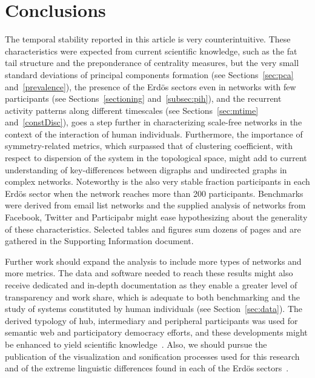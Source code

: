 \documentclass[%
	aip,
	jmp,%
	amsmath,amssymb,
	reprint,%
]{revtex4-1}
\begin{document}
\section{Conclusions}\label{sec:conc}
The temporal stability reported in this article is very counterintuitive.
These characteristics were expected from current scientific knowledge,
such as the fat tail structure and the preponderance of centrality measures,
but the very small standard deviations of principal components formation
(see Sections~\ref{sec:pca} and~\ref{prevalence}),
the presence of the Erd\"os sectors even in networks with
few participants (see Sections~\ref{sectioning} and~\ref{subsec:pih}),
and the recurrent activity patterns along different timescales (see Sections~\ref{sec:mtime} and~\ref{constDisc}),
goes a step further in characterizing scale-free networks in the context
of the interaction of human individuals.
Furthermore, the importance of symmetry-related metrics,
which surpassed that of clustering coefficient,
with respect to dispersion of the system in the topological space,
might add to current understanding of key-differences between digraphs and
undirected graphs in complex networks.
Noteworthy is the also very stable fraction participants in each Erd\"os sector
when the network reaches more than 200 participants.
Benchmarks were derived from email list networks
and the supplied analysis of
networks from Facebook,
Twitter and Participabr might ease hypothesizing
about the generality of these characteristics.
Selected tables and figures sum dozens of pages
and are gathered in
the Supporting Information document.

Further work should expand the analysis to include
more types of networks and more metrics.
The data and software needed to reach these results
might also receive dedicated and in-depth
documentation as they enable a greater level of transparency
and work share,
which is adequate to both benchmarking
and the study of systems constituted
by human individuals (see Section~\ref{sec:data}).
The derived typology of hub, intermediary and peripheral participants
was used for semantic web and participatory democracy efforts,
and these developments might be enhanced to yield scientific knowledge~\cite{opa}.
Also, we should pursue the publication of the visualization and sonification
processes used for this research~\cite{versinus,animacoes} and
of the extreme linguistic differences found in each of the Erd\"os sectors~\cite{rcText}.


% 
% 
\end{document}
